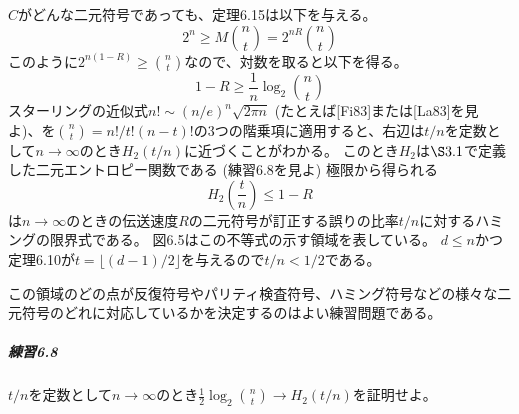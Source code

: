 \documentclass[12pt,a4paper]{article}
\begin{document}
    $C$がどんな二元符号であっても、定理6.15は以下を与える。
    \[ 2^n \geq M \binom{n}{t} = 2^{nR} \binom{n}{t} \]
    このように$2^{n(1-R)} \geq \binom{n}{t}$なので、対数を取ると以下を得る。
    \[ 1 - R \geq \frac{1}{n} \log_2 \binom{n}{t} \]
    スターリングの近似式$n! \sim {(n/e)}^n \sqrt{2 \pi n}$ (たとえば[Fi83]または[La83]を見よ)、を$\binom{n}{t} = n! / t! (n - t)! $の3つの階乗項に適用すると、右辺は$t/n$を定数として$n \rightarrow \infty$のとき$H_2 (t/n)$に近づくことがわかる。
    このとき$H_2$は$\S 3.1$で定義した二元エントロピー関数である (練習6.8を見よ)
    極限から得られる
    \[ H_2(\frac{t}{n}) \leq 1 - R \]
    は$n \rightarrow \infty$のときの伝送速度$R$の二元符号が訂正する誤りの比率$t/n$に対するハミングの限界式である。
    図6.5はこの不等式の示す領域を表している。
    $d \leq n$かつ定理6.10が$t = \lfloor (d - 1) / 2 \rfloor $を与えるので$t/n < 1/2$である。

    この領域のどの点が反復符号やパリティ検査符号、ハミング符号などの様々な二元符号のどれに対応しているかを決定するのはよい練習問題である。

      \subparagraph{練習6.8}
        $t/n$を定数として$n \rightarrow \infty$のとき$\frac{1}{2} \log_2 \binom{n}{t} \rightarrow H_2(t/n)$を証明せよ。
\end{document}
